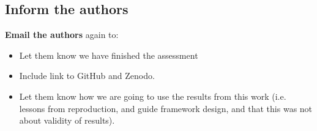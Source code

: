 \vspace{0.5cm}
\subsection{Inform the authors}

\textbf{Email the authors} again to:
\begin{itemize}
    \item Let them know we have finished the assessment
    \item Include link to GitHub and Zenodo.
    \item Let them know how we are going to use the results from this work (i.e. lessons from reproduction, and guide framework design, and that this was not about validity of results).
\end{itemize}